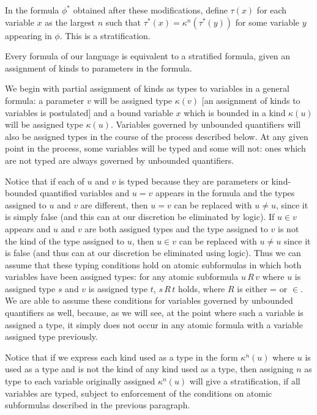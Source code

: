 \documentclass[12pt]{article}
\begin{document}
 In the formula
$\phi^*$ obtained after these modifications, define $\tau(x)$ for each variable $x$ as the largest $n$ such that $\tau^*(x) = \kappa^n(\tau^*(y))$ for some variable $y$ appearing in $\phi$.  This is a stratification.  \endproof



\begin{thm}   Every formula of our language is equivalent to a stratified formula, given an assignment of kinds to parameters in the formula.\end{thm}

\Proof

We begin with partial assignment of kinds as types to variables in a general formula:  a parameter $v$ will be 
assigned type $\kappa(v)$ [an assignment of kinds to variables is postulated] and a bound variable $x$ which is bounded in a kind $\kappa(u)$ will be assigned type $\kappa(u)$.  Variables governed by unbounded quantifiers will also be assigned types in the course of the process described below.  At any given point in the process, some variables will be typed and some will not:  ones which are not typed are always governed by unbounded quantifiers.

Notice that if each of $u$ and $v$ is typed because they are parameters or kind-bounded quantified variables and $u=v$ appears in the formula and the types assigned to $u$ and $v$ are different, then $u=v$ can be replaced with $u \neq u$, since it is simply false (and this can at our discretion be eliminated by logic).  If $u \in v$ appears and $u$ and $v$ are both assigned types and the type assigned to $v$ is not the kind of the type assigned to $u$, then $u \in v$ can be replaced with $u \neq u$ since it is false (and thus can at our discretion be eliminated using logic).  Thus we can assume that these typing conditions hold on atomic subformulas in which both variables have been assigned types:  for any atomic subformula $u \, R\, v$ where $u$  is assigned type $s$ and $v$ is assigned
type $t$, $s \, R \, t$ holds, where $R$ is either = or $\in$.  We are able to assume these conditions for variables governed by unbounded quantifiers as well, because, as we will see, at the point where such a variable is assigned a type, it simply does not occur in any atomic formula with a variable assigned type previously.

Notice that if we express each kind used as a type in the form $\kappa^n(u)$ where $u$ is used as a type and is not the kind of any kind used as a type, then assigning $n$ as type to each variable originally assigned $\kappa^n(u)$ will give a stratification, if all variables are typed, subject to enforcement of the conditions on atomic subformulas described in the previous paragraph.
\end{document}

